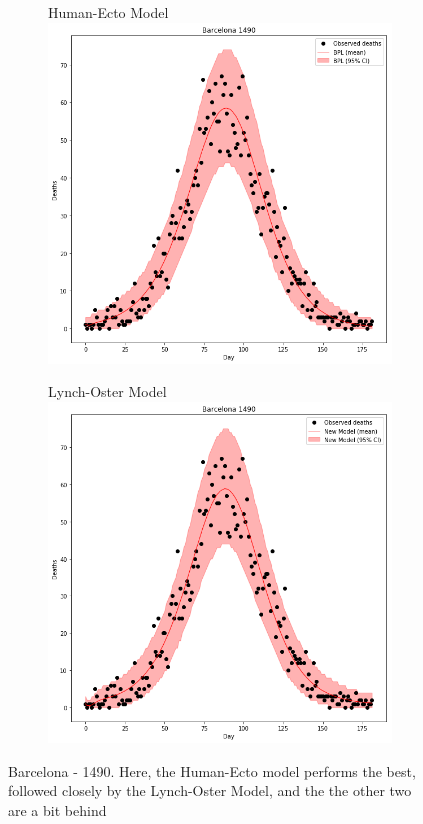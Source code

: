 \documentclass [letterpaper, 12pt] {article}
\begin{document}
\begin{figure}[H]
\begin{subfigure}{0.48\textwidth}
	\end{subfigure}
	\begin{subfigure}{0.48\textwidth}
	\centering
	Human-Ecto Model
	\includegraphics[width=\linewidth]{hum_ecto_barcelona.png}
	\end{subfigure}\hspace{\fill}
	\begin{subfigure}{0.48\textwidth}
	\centering
	Lynch-Oster Model
	\includegraphics[width=\linewidth]{rats2_lynch_oster_barcelona.png}
	\end{subfigure}
	\caption{Barcelona - 1490. Here, the Human-Ecto model performs the best, followed closely by the Lynch-Oster Model, and the the other two are a bit behind}
\end{figure}
\end{document}
